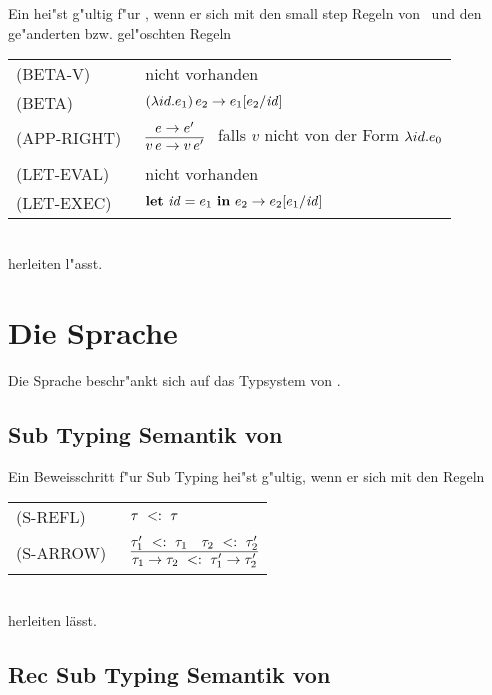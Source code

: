 Ein  hei"st g"ultig f"ur \LONECBN, wenn er sich mit den small step Regeln von \LONE\ 
und den ge"anderten bzw. gel"oschten Regeln\\[5mm]
  \begin{tabular}{ll}
     \mbox{(BETA-V)}      & nicht vorhanden \\[3mm]
     \mbox{(BETA)}        & $(\lambda id.e_1)\,e_2 \to e_1[e_2/{\text{\it id\/}}]$ \\[5mm]
     \mbox{(APP-RIGHT)\ } & $\regel{e \to e'}
                                   {v\,e \to v\,e'}$   \ 
                                   falls ${v}$ nicht von der Form $\lambda id.e_0$ \\[5mm]
     \mbox{(LET-EVAL)\  } & nicht vorhanden \\[3mm]
     \mbox{(LET-EXEC)}    & $\textbf{let}\ {\text{\it id\/}} = e_1\ \textbf{in}\ e_2 \to e_2[e_1/{\text{\it id\/}}]$
  \end{tabular}\\[7mm]
herleiten l"asst.

\section{Die Sprache \LONESUB}
Die Sprache \LONESUB beschr"ankt sich auf das Typsystem von \LONE. 

\subsection{Sub Typing Semantik von \LONESUB}

Ein Beweisschritt f"ur Sub Typing hei"st g"ultig, wenn er sich mit den Regeln  \\[5mm]
  \begin{tabular}{ll}
    \mbox{(S-REFL)\ }       & $\tau\ <:\ \tau$  \\[1mm]
    \mbox{(S-ARROW)\ }      & $\RULE{\subtype{\tau_1'} {\tau_1} \quad \subtype {\tau_2} {\tau_2'}}
                              {\subtype{\typeArrow{\tau_1}{\tau_2}} {\typeArrow{\tau_1'}{\tau_2'}}}$ \\[4mm]
  \end{tabular} \\[7mm]

herleiten l\"asst.

\subsection{Rec Sub Typing Semantik von \LONESUB}

